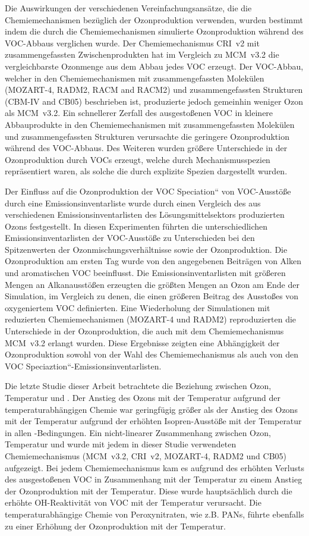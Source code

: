 Die Auswirkungen der verschiedenen Vereinfachungsansätze, die die Chemiemechanismen bezüglich der Ozonproduktion verwenden, wurden bestimmt indem die durch die Chemiemechanismen simulierte Ozonproduktion während des VOC-Abbaus verglichen wurde.
Der Chemiemechanismus CRI~v2 mit zusammengefassten Zwischenprodukten hat im Vergleich zu  MCM~v3.2 die vergleichbarste Ozonmenge aus dem Abbau jedes VOC erzeugt. 
Der VOC-Abbau, welcher in den Chemiemechanismen mit zusammengefassten Molekülen (MOZART-4, RADM2, RACM and RACM2) und zusammengefassten Strukturen (CBM-IV and CB05) beschrieben ist, produzierte jedoch gemeinhin weniger Ozon als MCM~v3.2. 
Ein schnellerer Zerfall des ausgestoßenen VOC in kleinere Abbauprodukte in den Chemiemechanismen mit zusammengefassten Molekülen und zusammengefassten Strukturen verursachte die geringere Ozonproduktion während des VOC-Abbaus. 
Des Weiteren wurden größere Unterschiede in der Ozonproduktion durch VOCs erzeugt, welche durch Mechanismusspezien repräsentiert waren, als solche die durch explizite Spezien dargestellt wurden.

Der Einfluss auf die Ozonproduktion der \quotedblbase VOC Speciation`` von VOC-Ausstöße durch eine Emissionsinventarliste wurde durch einen Vergleich des aus verschiedenen Emissionsinventarlisten des Lösungsmittelsektors produzierten Ozons festgestellt.
In diesen Experimenten führten die unterschiedlichen Emissionsinventarlisten der VOC-Ausstöße zu Unterschieden bei den Spitzenwerten der Ozonmischungsverhältnisse sowie der Ozonproduktion.
Die Ozonproduktion am ersten Tag wurde von den angegebenen Beiträgen von Alken und aromatischen VOC beeinflusst.
Die Emissionsinventarlisten mit größeren Mengen an Alkanausstößen erzeugten die größten Mengen an Ozon am Ende der Simulation, im Vergleich zu denen, die einen größeren Beitrag des Ausstoßes von oxygeniertem VOC definierten.
Eine Wiederholung der Simulationen mit reduzierten Chemiemechanismen (MOZART-4 und RADM2) reproduzierten die Unterschiede in der Ozonproduktion, die auch mit dem Chemiemechanismus MCM~v3.2 erlangt wurden.
Diese Ergebnisse zeigten eine Abhängigkeit der Ozonproduktion sowohl von der Wahl des Chemiemechanismus als auch von den \quotedblbase VOC Speciaztion``-Emissionsinventarlisten.

Die letzte Studie dieser Arbeit betrachtete die Beziehung zwischen Ozon, Temperatur und .
Der Anstieg des Ozons mit der Temperatur aufgrund der temperaturabhängigen Chemie war geringfügig größer als der Anstieg des Ozons mit der Temperatur aufgrund der erhöhten Isopren-Ausstöße mit der Temperatur in allen -Bedingungen.
Ein nicht-linearer Zusammenhang zwischen Ozon, Temperatur und  wurde mit jedem in dieser Studie verwendeten Chemiemechanismus (MCM~v3.2, CRI~v2, MOZART-4, RADM2 und CB05) aufgezeigt.
Bei jedem Chemiemechanismus kam es aufgrund des erhöhten Verlusts des ausgestoßenen VOC in Zusammenhang mit der Temperatur zu einem Anstieg der Ozonproduktion mit der Temperatur. Diese wurde hauptsächlich durch die erhöhte OH-Reaktivität von VOC mit der Temperatur verursacht.
Die temperaturabhängige Chemie von Peroxynitraten, wie z.B. PANs, führte ebenfalls zu einer Erhöhung der Ozonproduktion mit der Temperatur.

